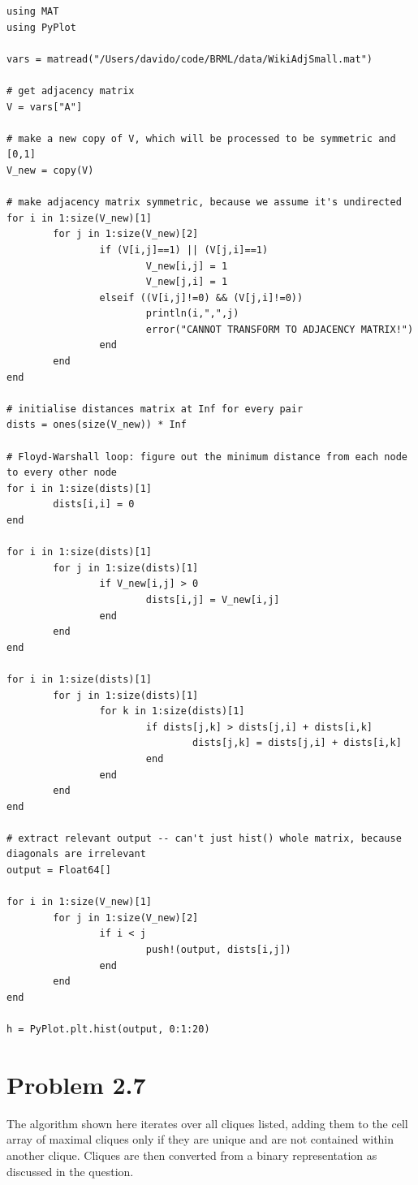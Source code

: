 \documentclass[11pt,a4paper,oneside]{report}
\begin{document}
\begin{lstlisting}
using MAT
using PyPlot

vars = matread("/Users/davido/code/BRML/data/WikiAdjSmall.mat")

# get adjacency matrix
V = vars["A"]

# make a new copy of V, which will be processed to be symmetric and [0,1]
V_new = copy(V)

# make adjacency matrix symmetric, because we assume it's undirected
for i in 1:size(V_new)[1]
        for j in 1:size(V_new)[2]
                if (V[i,j]==1) || (V[j,i]==1)
                        V_new[i,j] = 1
                        V_new[j,i] = 1
                elseif ((V[i,j]!=0) && (V[j,i]!=0))
                        println(i,",",j)
                        error("CANNOT TRANSFORM TO ADJACENCY MATRIX!")
                end
        end
end

# initialise distances matrix at Inf for every pair
dists = ones(size(V_new)) * Inf

# Floyd-Warshall loop: figure out the minimum distance from each node to every other node
for i in 1:size(dists)[1]
        dists[i,i] = 0
end

for i in 1:size(dists)[1]
        for j in 1:size(dists)[1]
                if V_new[i,j] > 0
                        dists[i,j] = V_new[i,j]
                end
        end
end

for i in 1:size(dists)[1]
        for j in 1:size(dists)[1]
                for k in 1:size(dists)[1]
                        if dists[j,k] > dists[j,i] + dists[i,k]
                                dists[j,k] = dists[j,i] + dists[i,k]
                        end
                end
        end
end

# extract relevant output -- can't just hist() whole matrix, because diagonals are irrelevant
output = Float64[]

for i in 1:size(V_new)[1]
        for j in 1:size(V_new)[2]
                if i < j
                        push!(output, dists[i,j])
                end
        end
end

h = PyPlot.plt.hist(output, 0:1:20)

\end{lstlisting}

\section*{Problem 2.7}
The algorithm shown here iterates over all cliques listed, adding them to the
cell array of maximal cliques only if they are unique and are not contained
within another clique. Cliques are then converted from a binary representation
as discussed in the question.
\end{document}
